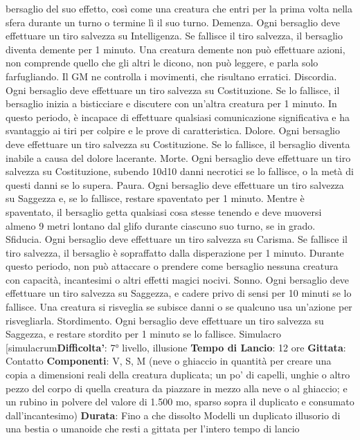 \begin{multicols}{2}
bersaglio del suo effetto, così come una creatura che
entri per la prima volta nella sfera durante un turno o
termine lì il suo turno.
Demenza. Ogni bersaglio deve effettuare un tiro
salvezza su Intelligenza. Se fallisce il tiro salvezza, il
bersaglio diventa demente per 1 minuto. Una creatura
demente non può effettuare azioni, non comprende
quello che gli altri le dicono, non può leggere, e parla
solo farfugliando. Il GM ne controlla i movimenti, che
risultano erratici.
Discordia. Ogni bersaglio deve effettuare un tiro
salvezza su Costituzione. Se lo fallisce, il bersaglio
inizia a bisticciare e discutere con un’altra creatura per
1 minuto. In questo periodo, è incapace di effettuare
qualsiasi comunicazione significativa e ha svantaggio ai
tiri per colpire e le prove di caratteristica.
Dolore. Ogni bersaglio deve effettuare un tiro salvezza
su Costituzione. Se lo fallisce, il bersaglio diventa
inabile a causa del dolore lacerante.
Morte. Ogni bersaglio deve effettuare un tiro salvezza
su Costituzione, subendo 10d10 danni necrotici se lo
fallisce, o la metà di questi danni se lo supera.
Paura. Ogni bersaglio deve effettuare un tiro salvezza
su Saggezza e, se lo fallisce, restare spaventato per 1
minuto. Mentre è spaventato, il bersaglio getta qualsiasi
cosa stesse tenendo e deve muoversi almeno 9 metri
lontano dal glifo durante ciascuno suo turno, se in
grado.
Sfiducia. Ogni bersaglio deve effettuare un tiro
salvezza su Carisma. Se fallisce il tiro salvezza, il
bersaglio è sopraffatto dalla disperazione per 1 minuto.
Durante questo periodo, non può attaccare o prendere
come bersaglio nessuna creatura con capacità,
incantesimi o altri effetti magici nocivi.
Sonno. Ogni bersaglio deve effettuare un tiro salvezza
su Saggezza, e cadere privo di sensi per 10 minuti se lo
fallisce. Una creatura si risveglia se subisce danni o se
qualcuno usa un’azione per risvegliarla.
Stordimento. Ogni bersaglio deve effettuare un tiro
salvezza su Saggezza, e restare stordito per 1 minuto
se lo fallisce.
Simulacro
[simulacrum\textbf{Difficolta'}:
7° livello, illusione
\textbf{Tempo di Lancio}: 12 ore
\textbf{Gittata}: Contatto
\textbf{Componenti}: V, S, M (neve o ghiaccio in quantità per
creare una copia a dimensioni reali della creatura
duplicata; un po’ di capelli, unghie o altro pezzo del
corpo di quella creatura da piazzare in mezzo alla neve
o al ghiaccio; e un rubino in polvere del valore di 1.500
mo, sparso sopra il duplicato e consumato
dall’incantesimo)
\textbf{Durata}: Fino a che dissolto
Modelli un duplicato illusorio di una bestia o umanoide
che resti a gittata per l’intero tempo di lancio

\end{multicols}
